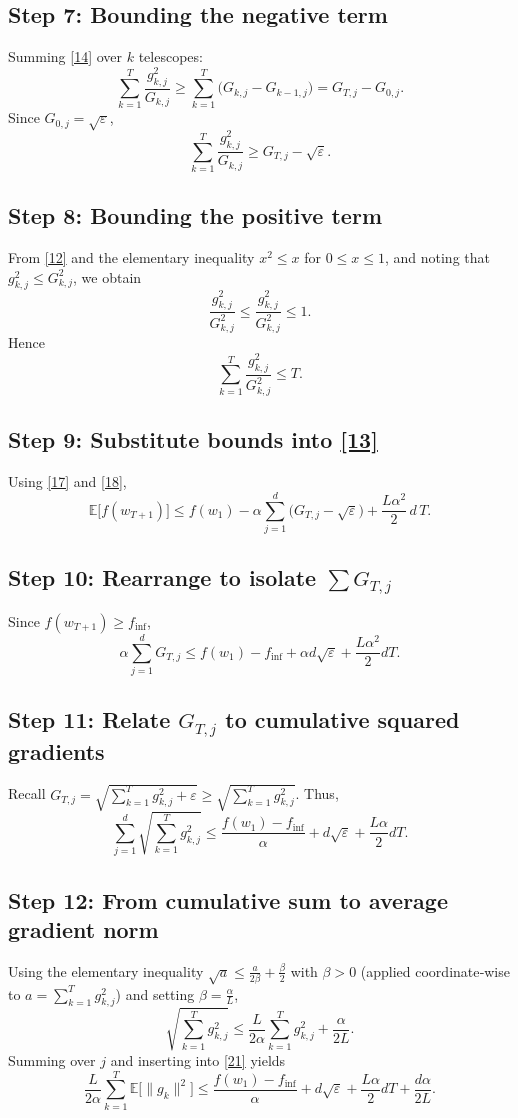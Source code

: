 \documentclass{article}
\newcommand{\E}{\mathbb{E}}
\begin{document}
\subsection*{Step 7: Bounding the negative term}
Summing \eqref{14} over $k$ telescopes:
\[
\sum_{k=1}^{T}\frac{g_{k,j}^{2}}{G_{k,j}} \ge \sum_{k=1}^{T}\big(G_{k,j}-G_{k-1,j}\big)
= G_{T,j}-G_{0,j}. \tag{16}
\]
Since $G_{0,j}=\sqrt{\varepsilon}$,
\[
\sum_{k=1}^{T}\frac{g_{k,j}^{2}}{G_{k,j}} \ge G_{T,j}-\sqrt{\varepsilon}. \tag{17}
\]

\subsection*{Step 8: Bounding the positive term}
From \eqref{12} and the elementary inequality $x^{2}\le x$ for $0\le x\le1$, and noting that $g_{k,j}^{2}\le G_{k,j}^{2}$, we obtain
\[
\frac{g_{k,j}^{2}}{G_{k,j}^{2}}\le \frac{g_{k,j}^{2}}{G_{k,j}^{2}} \le 1.
\]
Hence
\[
\sum_{k=1}^{T}\frac{g_{k,j}^{2}}{G_{k,j}^{2}} \le T. \tag{18}
\]

\subsection*{Step 9: Substitute bounds into \eqref{13}}
Using \eqref{17} and \eqref{18},
\[
\E\!\big[f(w_{T+1})\big] \le f(w_1)
- \alpha\sum_{j=1}^{d}\big(G_{T,j}-\sqrt{\varepsilon}\big)
+ \frac{L\alpha^{2}}{2}\, d\, T. \tag{19}
\]

\subsection*{Step 10: Rearrange to isolate $\sum G_{T,j}$}
Since $f(w_{T+1})\ge f_{\inf}$,
\[
\alpha\sum_{j=1}^{d}G_{T,j}
\le f(w_1)-f_{\inf}
+ \alpha d\sqrt{\varepsilon}
+ \frac{L\alpha^{2}}{2} d T. \tag{20}
\]

\subsection*{Step 11: Relate $G_{T,j}$ to cumulative squared gradients}
Recall $G_{T,j}= \sqrt{\sum_{k=1}^{T} g_{k,j}^{2}+\varepsilon}\ge \sqrt{\sum_{k=1}^{T} g_{k,j}^{2}}$.
Thus,
\[
\sum_{j=1}^{d}\sqrt{\sum_{k=1}^{T} g_{k,j}^{2}}\le
\frac{f(w_1)-f_{\inf}}{\alpha}
+ d\sqrt{\varepsilon}
+ \frac{L\alpha}{2} d T. \tag{21}
\]

\subsection*{Step 12: From cumulative sum to average gradient norm}
Using the elementary inequality $\sqrt{a}\le \frac{a}{2\beta}+\frac{\beta}{2}$ with $\beta>0$ (applied coordinate‑wise to $a=\sum_{k=1}^{T} g_{k,j}^{2}$) and setting $\beta = \frac{\alpha}{L}$,
\[
\sqrt{\sum_{k=1}^{T} g_{k,j}^{2}}
\le \frac{L}{2\alpha}\sum_{k=1}^{T} g_{k,j}^{2}
+ \frac{\alpha}{2L}. \tag{22}
\]
Summing over $j$ and inserting into \eqref{21} yields
\[
\frac{L}{2\alpha}\sum_{k=1}^{T}\E\!\big[\|g_k\|^{2}\big]
\le \frac{f(w_1)-f_{\inf}}{\alpha}
+ d\sqrt{\varepsilon}
+ \frac{L\alpha}{2} d T
+ \frac{d\alpha}{2L}. \tag{23}
\]
\end{document}
